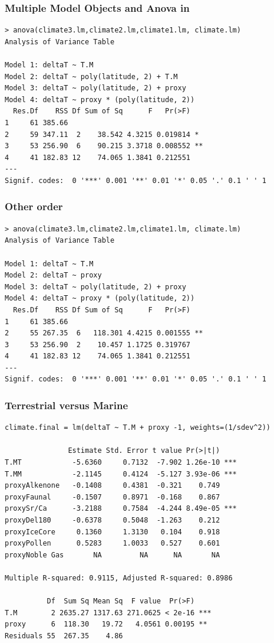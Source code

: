 \documentclass[handout]{beamer}
\begin{document}
\begin{frame}[fragile]
  \frametitle{Multiple Model Objects and Anova in \R}
\begin{verbatim}
> anova(climate3.lm,climate2.lm,climate1.lm, climate.lm)
Analysis of Variance Table

Model 1: deltaT ~ T.M
Model 2: deltaT ~ poly(latitude, 2) + T.M
Model 3: deltaT ~ poly(latitude, 2) + proxy
Model 4: deltaT ~ proxy * (poly(latitude, 2))
  Res.Df    RSS Df Sum of Sq      F   Pr(>F)
1     61 385.66
2     59 347.11  2    38.542 4.3215 0.019814 *
3     53 256.90  6    90.215 3.3718 0.008552 **
4     41 182.83 12    74.065 1.3841 0.212551
---
Signif. codes:  0 '***' 0.001 '**' 0.01 '*' 0.05 '.' 0.1 ' ' 1
\end{verbatim}
\end{frame}


\begin{frame}[fragile]
  \frametitle{Other order}
 \begin{small}
\begin{verbatim}
> anova(climate3.lm,climate2.lm,climate1.lm, climate.lm)
Analysis of Variance Table

Model 1: deltaT ~ T.M
Model 2: deltaT ~ proxy
Model 3: deltaT ~ poly(latitude, 2) + proxy
Model 4: deltaT ~ proxy * (poly(latitude, 2))
  Res.Df    RSS Df Sum of Sq      F   Pr(>F)
1     61 385.66
2     55 267.35  6   118.301 4.4215 0.001555 **
3     53 256.90  2    10.457 1.1725 0.319767
4     41 182.83 12    74.065 1.3841 0.212551
---
Signif. codes:  0 '***' 0.001 '**' 0.01 '*' 0.05 '.' 0.1 ' ' 1
\end{verbatim}
  \end{small}
\end{frame}


\begin{frame}[fragile]
  \frametitle{Terrestrial versus Marine}
\begin{small}
\begin{verbatim}
climate.final = lm(deltaT ~ T.M + proxy -1, weights=(1/sdev^2))

               Estimate Std. Error t value Pr(>|t|)
T.MT            -5.6360     0.7132  -7.902 1.26e-10 ***
T.MM            -2.1145     0.4124  -5.127 3.93e-06 ***
proxyAlkenone   -0.1408     0.4381  -0.321    0.749
proxyFaunal     -0.1507     0.8971  -0.168    0.867
proxySr/Ca      -3.2188     0.7584  -4.244 8.49e-05 ***
proxyDel180     -0.6378     0.5048  -1.263    0.212
proxyIceCore     0.1360     1.3130   0.104    0.918
proxyPollen      0.5283     1.0033   0.527    0.601
proxyNoble Gas       NA         NA      NA       NA

Multiple R-squared: 0.9115,	Adjusted R-squared: 0.8986

          Df  Sum Sq Mean Sq  F value  Pr(>F)
T.M        2 2635.27 1317.63 271.0625 < 2e-16 ***
proxy      6  118.30   19.72   4.0561 0.00195 **
Residuals 55  267.35    4.86
\end{verbatim}
\end{small}
\end{frame}
\end{document}
